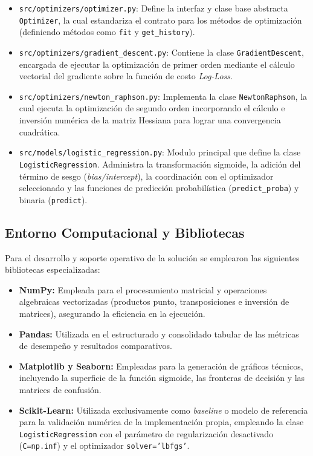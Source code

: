 \begin{itemize}
    \item \texttt{src/optimizers/optimizer.py}: Define la interfaz y clase base abstracta \texttt{Optimizer}, la cual estandariza el contrato para los métodos de optimización (definiendo métodos como \texttt{fit} y \texttt{get\_history}).
    
    \item \texttt{src/optimizers/gradient\_descent.py}: Contiene la clase \texttt{GradientDescent}, encargada de ejecutar la optimización de primer orden mediante el cálculo vectorial del gradiente sobre la función de costo \textit{Log-Loss}.
    
    \item \texttt{src/optimizers/newton\_raphson.py}: Implementa la clase \texttt{NewtonRaphson}, la cual ejecuta la optimización de segundo orden incorporando el cálculo e inversión numérica de la matriz Hessiana para lograr una convergencia cuadrática.
    
    \item \texttt{src/models/logistic\_regression.py}: Modulo principal que define la clase \texttt{LogisticRegression}. Administra la transformación sigmoide, la adición del término de sesgo (\textit{bias/intercept}), la coordinación con el optimizador seleccionado y las funciones de predicción probabilística (\texttt{predict\_proba}) y binaria (\texttt{predict}).
\end{itemize}

\subsection{Entorno Computacional y Bibliotecas}
Para el desarrollo y soporte operativo de la solución se emplearon las siguientes bibliotecas especializadas:
\begin{itemize}
    \item \textbf{NumPy:} Empleada para el procesamiento matricial y operaciones algebraicas vectorizadas (productos punto, transposiciones e inversión de matrices), asegurando la eficiencia en la ejecución.
    \item \textbf{Pandas:} Utilizada en el estructurado y consolidado tabular de las métricas de desempeño y resultados comparativos.
    \item \textbf{Matplotlib y Seaborn:} Empleadas para la generación de gráficos técnicos, incluyendo la superficie de la función sigmoide, las fronteras de decisión y las matrices de confusión.
    \item \textbf{Scikit-Learn:} Utilizada exclusivamente como \textit{baseline} o modelo de referencia para la validación numérica de la implementación propia, empleando la clase \texttt{LogisticRegression} con el parámetro de regularización desactivado (\texttt{C=np.inf}) y el optimizador \texttt{solver='lbfgs'}.
\end{itemize}

